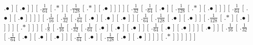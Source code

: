\documentclass[a4paper,10pt]{article}
\begin{document}
\begin{landscape}
{.$\bullet$ ]  [ .$\bullet$ ]  ]  [ .$\frac{1}{64}$  [ .$*$ ]  [ .$\frac{1}{128}$  [ .$*$ ]  [ .$\bullet$ ]  ]  ]  ]  [ .$\frac{1}{32}$  [ .$\frac{1}{64}$  [ .$\bullet$ ]  [ .$\frac{1}{128}$  [ .$*$ ]  [ .$\bullet$ ]  ]  ]  [ .$\frac{1}{64}$  [ .$\bullet$ ]  [ .$\bullet$ ]  ]  ]  ]  [ .$\frac{1}{16}$  [ .$\frac{1}{32}$  [ .$\frac{1}{64}$  [ .$\bullet$ ]  [ .$\bullet$ ]  [ .$\bullet$ ]  ]  [ .$\frac{1}{64}$  [ .$\frac{1}{128}$  [ .$\bullet$ ]  [ .$\bullet$ ]  ]  [ .$\frac{1}{128}$  [ .$*$ ]  [ .$\bullet$ ]  ]  ]  ]  [ .$*$ ]  ]  ]  [ .$\frac{1}{8}$  [ .$\frac{1}{16}$  [ .$\frac{1}{32}$  [ .$\frac{1}{64}$  [ .$\bullet$ ]  [ .$\bullet$ ]  [ .$\bullet$ ]  ]  [ .$\frac{1}{64}$  [ .$\bullet$ ]  [ .$\bullet$ ]  ]  ]  [ .$\bullet$ ]  ]  [ .$\frac{1}{16}$  [ .$\frac{1}{32}$  [ .$\frac{1}{64}$  [ .$\bullet$ ]  [ .$\bullet$ ]  [ .$\bullet$ ]  ]  [ .$\frac{1}{64}$  [ .$\bullet$ ]  [ .$\frac{1}{128}$  [ .$\bullet$ ]  [ .$\bullet$ ]  ]  ]  ]  [ .$*$ ]  ]  ]  ]  ]  ]
}

\end{landscape}
\end{document}
